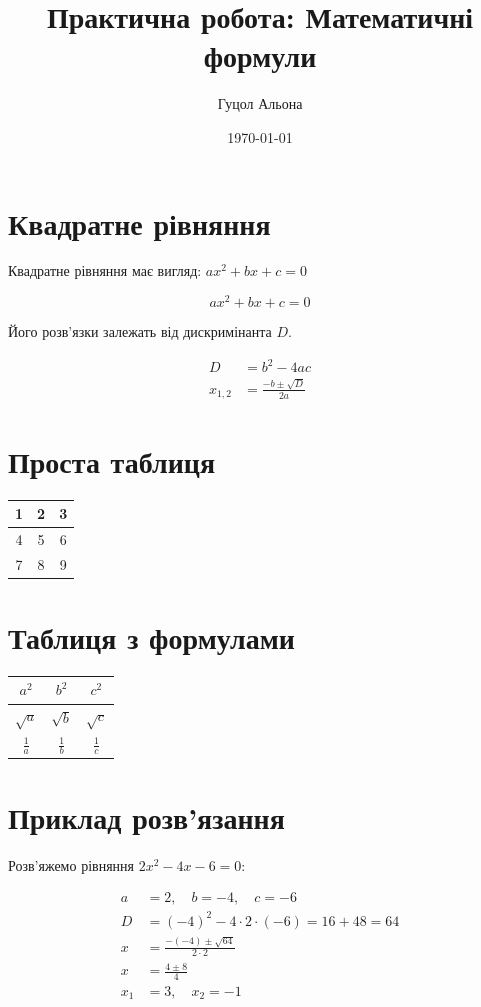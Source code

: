 \documentclass[12pt]{article} %
\title{Практична робота: Математичні формули}
\author{Гуцол Альона}
\date{\today}
\begin{document}

\maketitle %

\section*{Квадратне рівняння}

Квадратне рівняння має вигляд: $ax^2 + bx + c = 0$

\begin{equation}
ax^2 + bx + c = 0
\end{equation}

Його розв’язки залежать від дискримінанта $D$.

\begin{align}
D &= b^2 - 4ac \\
x_{1,2} &= \frac{-b \pm \sqrt{D}}{2a}
\end{align}
\section*{Проста таблиця}

\begin{tabular}{|c|c|c|}
\hline
1 & 2 & 3 \\
\hline
4 & 5 & 6 \\
\hline
7 & 8 & 9 \\
\hline
\end{tabular}
\section*{Таблиця з формулами}

\begin{tabular}{|c|c|c|}
\hline
$a^2$ & $b^2$ & $c^2$ \\
\hline
$\sqrt{a}$ & $\sqrt{b}$ & $\sqrt{c}$ \\
\hline
$\frac{1}{a}$ & $\frac{1}{b}$ & $\frac{1}{c}$ \\
\hline
\end{tabular}
\section*{Приклад розв'язання}

Розв’яжемо рівняння $2x^2 - 4x - 6 = 0$:

\begin{align*}
a &= 2,\quad b = -4,\quad c = -6 \\
D &= (-4)^2 - 4 \cdot 2 \cdot (-6) = 16 + 48 = 64 \\
x &= \frac{-(-4) \pm \sqrt{64}}{2 \cdot 2} \\
x &= \frac{4 \pm 8}{4} \\
x_1 &= 3,\quad x_2 = -1
\end{align*}
\end{document}
